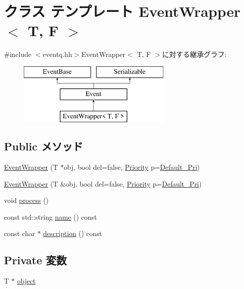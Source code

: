 \hypertarget{classEventWrapper}{
\section{クラス テンプレート EventWrapper$<$ T, F $>$}
\label{classEventWrapper}
}


{\ttfamily \#include $<$eventq.hh$>$}EventWrapper$<$ T, F $>$に対する継承グラフ:\begin{figure}[H]
\begin{center}
\leavevmode
\includegraphics[height=3cm]{classEventWrapper}
\end{center}
\end{figure}
\subsection*{Public メソッド}
\begin{DoxyCompactItemize}
\item 
\hyperlink{classEventWrapper_a3d9e3a20f104924988d16bcb11016d3d}{EventWrapper} (T $\ast$obj, bool del=false, \hyperlink{classEventBase_a6d92f7ee8144a5911ed46d85a89a4934}{Priority} p=\hyperlink{classEventBase_a6bd0fef0ad63ee49ad5ece92a9dd5f8f}{Default\_\-Pri})
\item 
\hyperlink{classEventWrapper_a77b6c62cc5484c5f144960b7f6a74fe3}{EventWrapper} (T \&obj, bool del=false, \hyperlink{classEventBase_a6d92f7ee8144a5911ed46d85a89a4934}{Priority} p=\hyperlink{classEventBase_a6bd0fef0ad63ee49ad5ece92a9dd5f8f}{Default\_\-Pri})
\item 
void \hyperlink{classEventWrapper_a2e9c5136d19b1a95fc427e0852deab5c}{process} ()
\item 
const std::string \hyperlink{classEventWrapper_a6490f765a824ced1cc94979609fe7e07}{name} () const 
\item 
const char $\ast$ \hyperlink{classEventWrapper_a2bd90422eece9190794479e08092a252}{description} () const 
\end{DoxyCompactItemize}
\subsection*{Private 変数}
\begin{DoxyCompactItemize}
\item 
T $\ast$ \hyperlink{classEventWrapper_acd5a12b9b1a75e37fd605accfe038a03}{object}
\end{DoxyCompactItemize}
